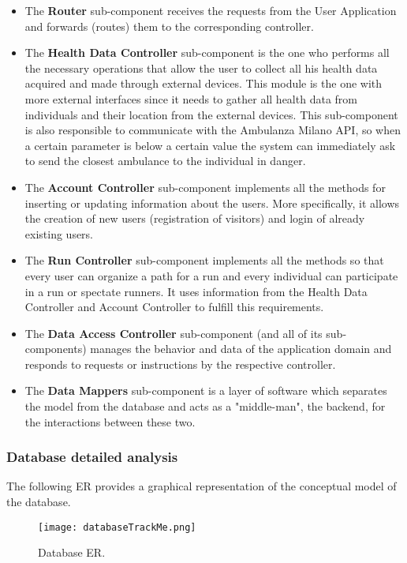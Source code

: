 \documentclass[12pt]{article}
\begin{document}
\begin{itemize}
    \item The \textbf{Router} sub-component receives the requests from the User Application and forwards (routes) them to the corresponding controller.
    \item The \textbf{Health Data Controller} sub-component is the one who performs all the necessary
          operations that allow the user to collect all his health data acquired and made through external devices. This module is the one with more external interfaces since it needs to gather all health data from individuals and their location from the external devices. This sub-component is also responsible to communicate with the Ambulanza Milano API, so when a certain parameter is below a certain value the system can immediately ask to send the closest ambulance to the individual in danger. 
    \item The \textbf{Account Controller} sub-component implements all the methods for inserting or updating information about the users. More specifically, it allows the creation of new users (registration of visitors) and login of already existing users.
    \item The \textbf{Run Controller} sub-component implements all the methods so that every user can organize a path for a run and every individual can participate in a run or spectate runners. It uses information from the Health Data Controller and Account Controller to fulfill this requirements.

    \item The \textbf{Data Access Controller} sub-component (and all of its sub-components) manages the behavior and data of the application domain and responds to requests or instructions by the respective controller.
    \item The \textbf{Data Mappers} sub-component is a layer of software which separates the model from the database and acts as a "middle-man", the backend, for the interactions between these two.
\end{itemize}
\subsubsection{Database detailed analysis}
The following ER provides a graphical representation of the conceptual model of the database.
\vspace{20mm}

\begin{figure}[H]
\centering
\centerline{\texttt{[image: databaseTrackMe.png]}}
\caption{Database ER.}
\label{fig:databaseTrackMe}
\end{figure}
\end{document}
